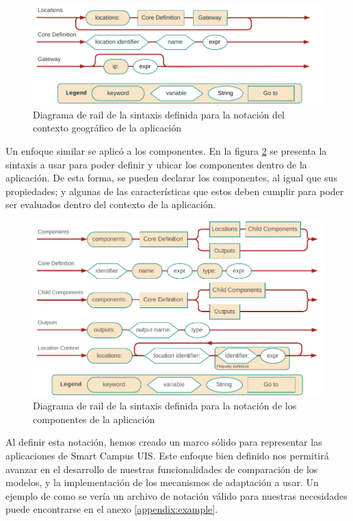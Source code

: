 \begin{figure}[H]
    \centering
    \caption{Diagrama de rail de la sintaxis definida para la notación del contexto geográfico de la aplicación}
    \label{fig:rail-location}
    \vspace{2mm}
    \includegraphics[width=0.8\linewidth]{images/Railroad Locations Alt.pdf}
\end{figure}

Un enfoque similar se aplicó a los componentes. En la figura \ref{fig:rail-components} se presenta la sintaxis a usar para poder definir y ubicar los componentes dentro de la aplicación. De esta forma, se pueden declarar los componentes, al igual que sus propiedades; y algunas de las características que estos deben cumplir para poder ser evaluados dentro del contexto de la aplicación.

\begin{figure}[H]
    \centering
    \caption{Diagrama de rail de la sintaxis definida para la notación de los componentes de la aplicación}
    \label{fig:rail-components}
    \vspace{2mm}
    \includegraphics[width=0.8\linewidth]{images/Railroad Components Alt.pdf}
\end{figure}

Al definir esta notación, hemos creado un marco sólido para representar las aplicaciones de Smart Campus UIS. Este enfoque bien definido nos permitirá avanzar en el desarrollo de nuestras funcionalidades de comparación de los modelos, y la implementación de los mecanismos de adaptación a usar. Un ejemplo de como se vería un archivo de notación válido para nuestras necesidades puede encontrarse en el anexo \ref{appendix:example}. 

